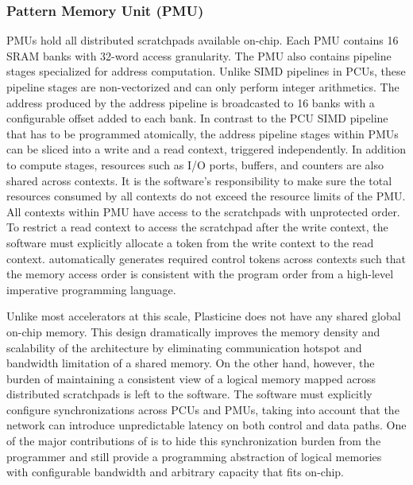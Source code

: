 \subsubsection{Pattern Memory Unit (PMU)}
PMUs hold all distributed scratchpads available on-chip. 
Each PMU contains 16 SRAM banks with
32-word access granularity. The PMU also contains pipeline stages specialized for address
computation. Unlike SIMD pipelines in PCUs, these pipeline stages are non-vectorized and can only perform integer arithmetics. 
The address produced by the address pipeline is broadcasted to 16 banks with a configurable offset added to each bank.
In contrast to the PCU SIMD pipeline that has to be programmed atomically, the address pipeline stages within PMUs can be sliced into a write and a read context, triggered independently.
In addition to compute stages, resources such as I/O ports, buffers, and counters are also shared across contexts.
It is the software's responsibility to make sure the total resources consumed by all
contexts do not exceed the resource limits of the PMU.
All contexts within PMU have access to the scratchpads with unprotected order. To
restrict a read context to access the scratchpad after the write context, the software must explicitly allocate
a token from the write context to the read context.
\name automatically generates required control tokens across contexts such that the memory access order is
consistent with the program order from a high-level imperative programming language.

Unlike most accelerators at this scale, Plasticine does not have any shared global on-chip memory. 
This design dramatically improves the memory density and scalability of the architecture 
by eliminating communication hotspot and bandwidth limitation of a shared memory.
On the other hand, however, the burden of maintaining a consistent view of a logical memory mapped
across distributed scratchpads is left to the software.
The software must explicitly configure synchronizations across PCUs and PMUs, taking into account
that the network can introduce unpredictable latency on both control and data paths.
One of the major contributions of \name is to hide this synchronization burden from the programmer and still provide a programming abstraction of logical memories with configurable bandwidth and arbitrary capacity that fits on-chip.

